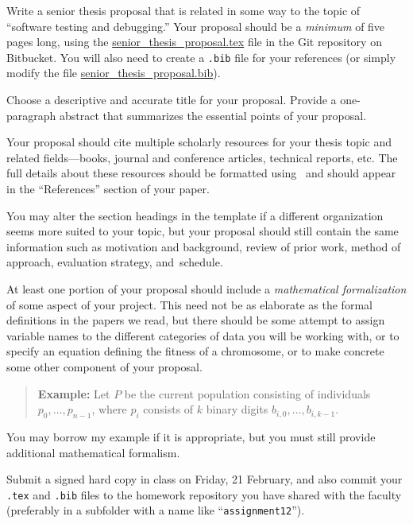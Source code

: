 

\usepackage{ulem}
\usepackage[compact]{titlesec}




Write a senior thesis proposal that is related in some way to the topic of ``software testing and debugging.'' Your
proposal should be a {\em minimum} of five pages long, using the \url{senior_thesis_proposal.tex} file in the Git
repository on Bitbucket.  You will also need to create a {\tt .bib} file for your references (or simply modify the file
\url{senior_thesis_proposal.bib}).

Choose a descriptive and accurate title for your proposal. Provide a one-paragraph abstract that summarizes the
essential points of your proposal.

Your proposal should cite multiple scholarly resources for your thesis topic and related fields---books, journal and
conference articles, technical reports, etc. The full details about these resources should be formatted using \BibTeX\
and should appear in the ``References'' section of your paper.

You may alter the section headings in the template if a different organization seems more suited to your topic, but your
proposal should still contain the same information such as motivation and background, review of prior work,
method of approach, evaluation strategy, \mbox{and schedule}.

At least one portion of your proposal should include a {\em mathematical formalization} of some  aspect of your project.
This need not be as elaborate as the formal definitions in the papers we read, but there should be some attempt to
assign variable names to the different categories of data you will be working with, or to specify an equation defining
the fitness of a chromosome, or to make concrete some other component of your proposal.

\begin{quote}
{\bf Example:} Let $P$ be the current population consisting of individuals
$p_0, \ldots, p_{n-1}$, where $p_i$ consists of $k$ binary digits
$b_{i,0}, \ldots, b_{i,k-1}$.
\end{quote}
You may borrow my example if it is appropriate, but you must still provide
additional mathematical formalism.

Submit a signed hard copy in class on Friday, 21 February, and
also commit your {\tt .tex} and {\tt .bib} files to the homework
repository you have shared with the faculty (preferably in a subfolder
with a name like ``{\tt assignment12}'').

